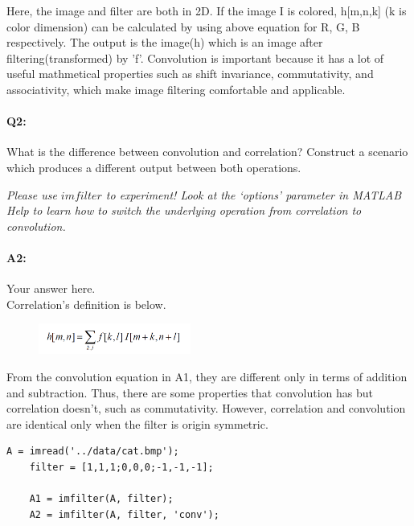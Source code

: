     Here, the image and filter are both in 2D. If the image I is colored, h[m,n,k] (k is color dimension) can be calculated by using above equation for R, G, B respectively. The output is the image(h) which is an image after filtering(transformed) by 'f'. Convolution is important because it has a lot of useful mathmetical properties such as shift invariance, commutativity, and associativity, which make image filtering comfortable and applicable. 
	
	
	
	
	
	\pagebreak
	\paragraph{Q2:} What is the difference between convolution and correlation? Construct a scenario which produces a different output between both operations.
	
	\emph{Please use \href{https://www.mathworks.com/help/images/ref/imfilter.html}{$imfilter$} to experiment! Look at the `options' parameter in MATLAB Help to learn how to switch the underlying operation from correlation to convolution.}
	
	\paragraph{A2:} Your answer here.
    \\ 	
    Correlation's definition is below.
    \begin{figure}[h]
    \centering
    \includegraphics[width=5cm]{questions/correlation.PNG}
    \label{fig:equation2}
    \end{figure}
    
    From the convolution equation in A1, they are different only in terms of addition and subtraction. Thus, there are some properties that convolution has but correlation doesn't, such as commutativity. However, correlation and convolution are identical only when the filter is origin symmetric.\\
    
    \begin{lstlisting}[style=Matlab-editor]
    A = imread('../data/cat.bmp');
    filter = [1,1,1;0,0,0;-1,-1,-1];
    
    A1 = imfilter(A, filter);
    A2 = imfilter(A, filter, 'conv');
    \end{lstlisting}
    
